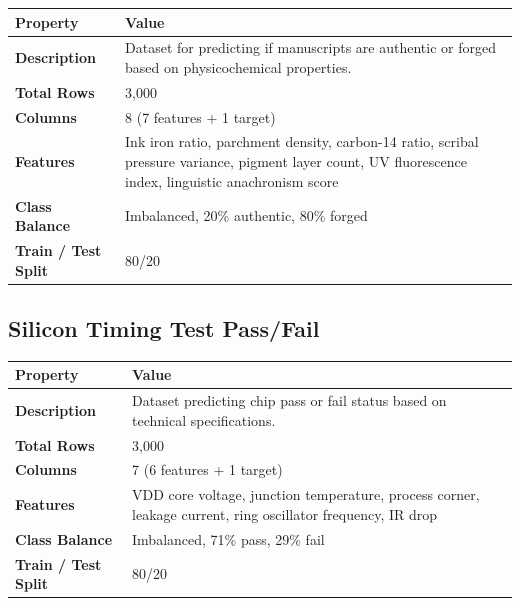 \documentclass[11pt,a4paper]{article}
\begin{document}
\begin{tabularx}{\linewidth}{@{}>{\bfseries}l X @{}}
  \arrayrulecolor{tableheader}
  \toprule
  \rowcolor{tableheader} Property & Value \\
  \midrule
  \rowcolor{white} Description & Dataset for predicting if manuscripts are authentic or forged based on physicochemical properties. \\
  \rowcolor{tablerow} Total Rows & 3,000 \\
  \rowcolor{white} Columns & 8 (7 features + 1 target) \\
  \rowcolor{tablerow} Features & Ink iron ratio, parchment density, carbon-14 ratio, scribal pressure variance, pigment layer count, UV fluorescence index, linguistic anachronism score \\
  \rowcolor{white} Class Balance & Imbalanced, 20\% authentic, 80\% forged \\
  \rowcolor{tablerow} Train / Test Split & 80/20 \\
  \bottomrule
\end{tabularx}

\vspace{6pt}

\subsection{Silicon Timing Test Pass/Fail}

\begin{tabularx}{\linewidth}{@{}>{\bfseries}l X @{}}
  \arrayrulecolor{tableheader}
  \toprule
  \rowcolor{tableheader} Property & Value \\
  \midrule
  \rowcolor{white} Description & Dataset predicting chip pass or fail status based on technical specifications. \\
  \rowcolor{tablerow} Total Rows & 3,000 \\
  \rowcolor{white} Columns & 7 (6 features + 1 target) \\
  \rowcolor{tablerow} Features & VDD core voltage, junction temperature, process corner, leakage current, ring oscillator frequency, IR drop \\
  \rowcolor{white} Class Balance & Imbalanced, 71\% pass, 29\% fail \\
  \rowcolor{tablerow} Train / Test Split & 80/20 \\
  \bottomrule
\end{tabularx}

\end{document}
